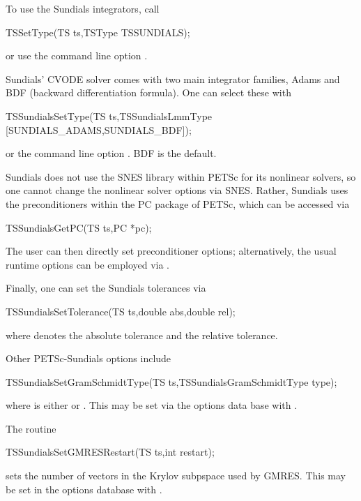 To use the Sundials integrators, call
\begin{tabbing}
 TSSetType(TS ts,TSType TSSUNDIALS);
\end{tabbing}
or use the command line option  . 
  

Sundials' CVODE solver comes with two main integrator families, Adams
and BDF (backward differentiation formula). One can select these with
\begin{tabbing}
 TSSundialsSetType(TS ts,TSSundialsLmmType [SUNDIALS\_ADAMS,SUNDIALS\_BDF]);
\end{tabbing}
or the command line option . BDF is
the default. 
 

Sundials does not use the SNES library within PETSc for its nonlinear
solvers, so one cannot change the nonlinear solver options via
SNES. Rather, Sundials uses the preconditioners within the PC package
of PETSc, which can be accessed via
\begin{tabbing}
 TSSundialsGetPC(TS ts,PC *pc);
\end{tabbing}
The user can then directly set preconditioner options; 
alternatively, the usual runtime options can be employed
via . 

Finally, one can set the Sundials tolerances via
\begin{tabbing}
 TSSundialsSetTolerance(TS ts,double abs,double rel);
\end{tabbing}
where  denotes the absolute tolerance and 
the relative tolerance. 

Other PETSc-Sundials options include
\begin{tabbing}
  TSSundialsSetGramSchmidtType(TS ts,TSSundialsGramSchmidtType type);
\end{tabbing}
where  is either  or
. 
 This may be set via the options data base
with .

The routine 
\begin{tabbing}
  TSSundialsSetGMRESRestart(TS ts,int restart);
\end{tabbing}
sets the number of vectors in the Krylov subpspace used by GMRES.
This may be set in the options 
database with  . 


